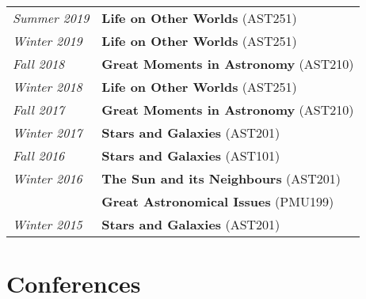 \documentclass[10pt]{res} %
\begin{document}
\begin{resume}
\begin{table}[h!]
\begin{tabularx}{\textwidth}{lX}
\textit{Summer 2019} & \textbf{Life on Other Worlds} (AST251) \\
\textit{Winter 2019} & \textbf{Life on Other Worlds} (AST251) \\
\textit{Fall 2018}      & \textbf{Great Moments in Astronomy} (AST210) \\
\textit{Winter 2018} & \textbf{Life on Other Worlds} (AST251) \\
\textit{Fall 2017}      & \textbf{Great Moments in Astronomy} (AST210) \\
\textit{Winter 2017} & \textbf{Stars and Galaxies} (AST201) \\
\textit{Fall 2016} & \textbf{Stars and Galaxies} (AST101) \\
\textit{Winter 2016}  & \textbf{The Sun and its Neighbours} (AST201) \\
                                & \textbf{Great Astronomical Issues} (PMU199) \\
\textit{Winter 2015} & \textbf{Stars and Galaxies} (AST201)
\end{tabularx}
\end{table}


\newpage
\section{\Large Conferences}
\vspace{-5pt} %
\noindent\makebox[\linewidth]{\rule{\textwidth}{0.4pt}}
\vspace{-20pt} %


\end{resume}
\end{document}

